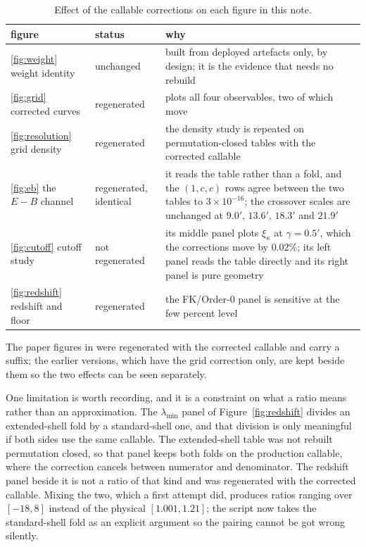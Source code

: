 \begin{table}[h]
\centering
\begin{tabular}{llp{6.2cm}}
\toprule
figure & status & why \\
\midrule
\ref{fig:weight} weight identity & unchanged & built from deployed
artefacts only, by design; it is the evidence that needs no rebuild \\
\ref{fig:grid} corrected curves & regenerated & plots all four
observables, two of which move \\
\ref{fig:resolution} grid density & regenerated & the density study is
repeated on permutation-closed tables with the corrected callable \\
\ref{fig:eb} the $E-B$ channel & regenerated, identical & it reads the
table rather than a fold, and the $(1,c,c)$ rows agree between the two
tables to $3\times10^{-16}$; the crossover scales are unchanged at
$9.0'$, $13.6'$, $18.3'$ and $21.9'$ \\
\ref{fig:cutoff} cutoff study & not regenerated & its middle panel plots
$\xi_\kappa$ at $\gamma=0.5'$, which the corrections move by $0.02\%$; its
left panel reads the table directly and its right panel is pure geometry \\
\ref{fig:redshift} redshift and floor & regenerated & the
FK/Order-0 panel is sensitive at the few percent level \\
\bottomrule
\end{tabular}
\caption{Effect of the callable corrections on each figure in this note.}
\label{tab:figfix}
\end{table}

The paper figures in  were regenerated with the
corrected callable and carry a  suffix; the earlier
 versions, which have the grid correction only, are kept
beside them so the two effects can be seen separately.

One limitation is worth recording, and it is a constraint on what a ratio
means rather than an approximation. The $\lambda_{\min}$ panel of
Figure~\ref{fig:redshift} divides an extended-shell fold by a
standard-shell one, and that division is only meaningful if both sides use
the same callable. The extended-shell table was not rebuilt permutation
closed, so that panel keeps both folds on the production callable, where
the correction cancels between numerator and denominator. The redshift
panel beside it is not a ratio of that kind and was regenerated with the
corrected callable. Mixing the two, which a first attempt did, produces
ratios ranging over $[-18, 8]$ instead of the physical $[1.001, 1.21]$;
the script now takes the standard-shell fold as an explicit argument so the
pairing cannot be got wrong silently.

